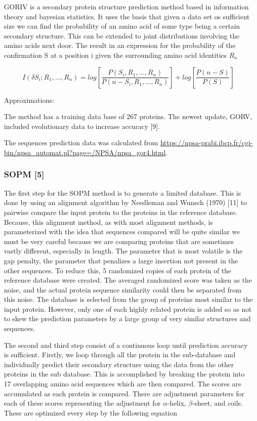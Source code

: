 \documentclass{article}
\begin{document}
GORIV is a secondary protein structure prediction method based in information theory and bayesian statistics. It uses the basis that given a data set os sufficient size we can find the probability of an amino acid of some type being a certain secondary structure. This can be extended to joint distributions involving the amino acids next door. The result in an expression for the probability of the confirmation S at a position i given the surrounding amino acid identities $R_n$

$$I(\delta S_i ; R_1, ... , R_n) = log[\frac{P(S_i,R_1,...,R_n)}{P(n-S_i,R_1,...,R_n)}] + log[\frac{P(n-S)}{P(S)}]$$

Approximations:

The method has a training data base of 267 proteins. The newest update, GORV, included evolutionary data to increase accuracy [9].

The sequences prediction data was calculated from \url{https://npsa-prabi.ibcp.fr/cgi-bin/npsa_automat.pl?page=/NPSA/npsa_gor4.html}.

\subsubsection{SOPM [5]}

The first step for the SOPM method is to generate a limited database. This is done by using an alignment algorithm by Needleman and Wunsch (1970) [11] to pairwise compare the input protein to the proteins in the reference database. Because, this alignment method, as with most alignment methods, is parameterized with the idea that sequences compared will be quite similar we must be very careful because we are comparing proteins that are sometimes vastly different, especially in length. The parameter that is most volatile is the gap penalty, the parameter that penalizes a large insertion not present in the other sequences. To reduce this, 5 randomized copies of each protein of the reference database were created. The averaged randomized score was taken as the noise, and the actual protein sequence similarity could then be separated from this noise. The database is selected from the group of proteins most similar to the input protein. However, only one of each highly related protein is added so as not to skew the prediction parameters by a large group of very similar structures and sequences. 

The second and third step consist of a continuous loop until prediction accuracy is sufficient. Firstly, we loop through all the protein in the sub-database and individually predict their secondary structure using the data from the other proteins in the sub database. This is accomplished by breaking the protein into 17 overlapping amino acid sequences which are then compared. The scores are accumulated as each protein is compared. There are adjustment parameters for each of these scores representing the adjustment for $\alpha$-helix, $\beta$-sheet, and coils. These are optimized every step by the following equation
\end{document}

